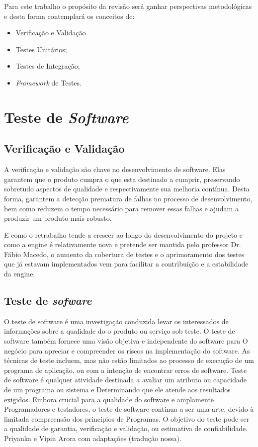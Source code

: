 \vfill
\pagebreak

    Para este trabalho o propósito da revisão será ganhar perspectivas metodológicas e desta forma contemplará os conceitos de:

    \begin{itemize}

        \item Verificação e Validação
        \item Testes Unitários;
        \item Testes de Integração;
        \item \textit{Framework} de Testes.

    \end{itemize}


\section{Teste de \textit{Software}}
   
\subsection{Verificação e Validação}

A verificação e validação são chave no desenvolvimento de software.
Elas garantem que o produto cumpra o que esta destinado a cumprir,
preservando sobretudo aspectos de qualidade e respectivamente sua melhoria contínua.
Desta forma, garantem a detecção prematura de falhas no processo de desenvolvimento,
bem como reduzem o tempo necessário para remover essas falhas e ajudam a produzir um
produto mais robusto.


E como o retrabalho tende a crescer ao longo do desenvolvimento do projeto e como a engine é relativamente nova e pretende ser mantida pelo professor Dr. Fábio Macedo, o aumento da cobertura de testes e o aprimoramento dos testes que já estavam implementados vem para facilitar a contribuição e a estabilidade da engine.

\subsection{Teste de \textit{sofware}}
O teste de software é uma investigação conduzida levar os interessados de informações sobre a qualidade do o produto ou serviço sob teste. 
O teste de software também fornece uma visão objetiva e independente do software para
O negócio para apreciar e compreender os riscos na implementação do software. 
As técnicas de teste incluem, mas não estão limitados ao processo de execução de um programa de aplicação, ou com a intenção de encontrar erros de software.
 Teste de software é qualquer atividade destinada a avaliar um atributo ou capacidade de um programa ou sistema e Determinando que ele atende aos resultados exigidos. 
Embora crucial para a qualidade do software e amplamente Programadores e testadores, o teste de software continua a ser uma arte, devido à limitada compreensão dos princípios de Programas. 
 O objetivo do teste pode ser a qualidade de garantia, verificação e validação, ou estimativa de confiabilidade. 
Priyanka e Vipin Arora  com adaptações (tradução nossa).

